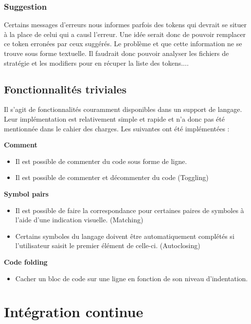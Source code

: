 \documentclass[
    iict, %
    il, %
]{heig-tb}
\begin{document}
\subsection{Suggestion}
Certains messages d'erreurs nous informes parfois des tokens qui devrait se situer à la place de celui qui a causl l'erreur.
Une idée serait donc de pouvoir remplacer ce token erronées par ceux suggérés.
Le problème et que cette information ne se trouve sous forme textuelle.
Il faudrait donc pouvoir analyser les fichiers de stratégie et les modifiers pour en récuper la liste des tokens....

\section{Fonctionnalités triviales}
Il s'agit de fonctionnalités couramment disponibles dans un support de langage. Leur implémentation est relativement simple et rapide et n'a donc pas été mentionnée dans le cahier des charges.
Les suivantes ont été implémentées :

\textbf{Comment}
\begin{itemize}
    \item Il est possible de commenter du code sous forme de ligne.
    \item Il est possible de commenter et décommenter du code (Toggling)
\end{itemize}

\textbf{Symbol pairs}
\begin{itemize}
    \item Il est possible de faire la correspondance pour certaines paires de symboles à l'aide d'une indication visuelle. (Matching)
    \item Certains symboles du langage doivent être automatiquement complétés si l'utilisateur saisit le premier élément de celle-ci. (Autoclosing)
\end{itemize}

\textbf{Code folding}
\begin{itemize}
    \item Cacher un bloc de code sur une ligne en fonction de son niveau d'indentation.
\end{itemize}


\chapter{Intégration continue}
\end{document}
